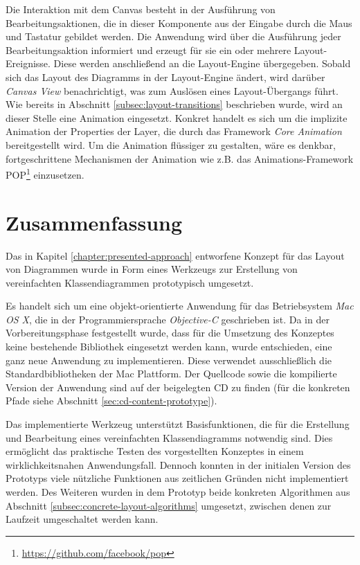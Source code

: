 Die Interaktion mit dem Canvas besteht in der Ausführung von Bearbeitungsaktionen, die in dieser Komponente aus der Eingabe durch die Maus und Tastatur gebildet werden. Die Anwendung wird über die Ausführung jeder Bearbeitungsaktion informiert und erzeugt für sie ein oder mehrere Layout-Ereignisse. Diese werden anschließend an die Layout-Engine übergegeben. Sobald sich das Layout des Diagramms in der Layout-Engine ändert, wird darüber \textit{Canvas View} benachrichtigt, was zum Auslösen eines Layout-Übergangs führt. Wie bereits in Abschnitt \ref{subsec:layout-transitions} beschrieben wurde, wird an dieser Stelle eine Animation eingesetzt. Konkret handelt es sich um die implizite Animation der Properties der Layer, die durch das Framework \textit{Core Animation} bereitgestellt wird. Um die Animation flüssiger zu gestalten, wäre es denkbar, fortgeschrittene Mechanismen der Animation wie z.B. das Animations-Framework POP\footnote{\url{https://github.com/facebook/pop}} einzusetzen.

\section{Zusammenfassung}
\label{sec:prototype-summary}

Das in Kapitel \ref{chapter:presented-approach} entworfene Konzept für das Layout von Diagrammen wurde in Form eines Werkzeugs zur Erstellung von vereinfachten Klassendiagrammen prototypisch umgesetzt.

Es handelt sich um eine objekt-orientierte Anwendung für das Betriebsystem \textit{Mac OS X}, die in der Programmiersprache \textit{Objective-C} geschrieben ist. Da in der Vorbereitungsphase festgestellt wurde, dass für die Umsetzung des Konzeptes keine bestehende Bibliothek eingesetzt werden kann, wurde entschieden, eine ganz neue Anwendung zu implementieren. Diese verwendet ausschließlich die Standardbibliotheken der Mac Plattform. Der Quellcode sowie die kompilierte Version der Anwendung sind auf der beigelegten CD zu finden (für die konkreten Pfade siehe Abschnitt \ref{sec:cd-content-prototype}).

Das implementierte Werkzeug unterstützt Basisfunktionen, die für die Erstellung und Bearbeitung eines vereinfachten Klassendiagramms notwendig sind. Dies ermöglicht das praktische Testen des vorgestellten Konzeptes in einem wirklichkeitsnahen Anwendungsfall. Dennoch konnten in der initialen Version des Prototyps viele nützliche Funktionen aus zeitlichen Gründen nicht implementiert werden. Des Weiteren wurden in dem Prototyp beide konkreten Algorithmen aus Abschnitt \ref{subsec:concrete-layout-algorithms} umgesetzt, zwischen denen zur Laufzeit umgeschaltet werden kann.


